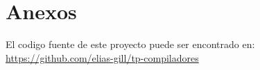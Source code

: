 \documentclass[12pt,a4paper]{article}
\begin{document}

\begin{titlepage}
	
\end{titlepage}
\newpage


\tableofcontents
\newpage








\section*{Anexos}
El codigo fuente de este proyecto puede ser encontrado en: 
\href{https://github.com/elias-gill/tp-compiladores}{https://github.com/elias-gill/tp-compiladores}
\end{document}
